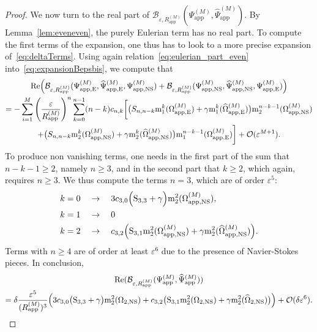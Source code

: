 \documentclass[11pt,reqno,a4paper]{amsart}
\def\eps{\varepsilon}
\def\Re{{\rm Re}}
\newcommand{\cB}{\mathcal{B}}
\newcommand{\cO}{\mathcal{O}}
\newcommand{\mrm}{\mathrm{m}}
\newcommand{\1}{\mathbbm{1}}
\theoremstyle{definition}
\theoremstyle{definition}
\numberwithin{equation}{section}
\newcommand{\Mapp}[2]{#1^{(#2)}_\mathrm{app}}
\newcommand{\Mappp}[3]{#1^{(#2)}_\mathrm{app,#3}}
\begin{document}
\begin{proof}
    We now turn to the real part of $\cB_{\eps,\Mapp{R}{M}}(\Mapp{\Psi}{M},\Mapp{\widehat{\Psi}}{M})$. By Lemma~\ref{lem:eveneven}, the purely Eulerian term has no real part. To compute the first terms of the expansion, one thus has to look to a more precise expansion of~\cref{eq:deltaTerms}. Using again relation~\cref{eq:eulerian_part_even} into~\cref{eq:expansionBepsbis}, we compute that
    \begin{multline}
        \Re\Big(\cB_{\eps,\Mapp{R}{M}}( \Mappp{\Psi}{M}{E},\Mappp{\widehat{\Psi}}{M}{E} ,\Mappp{\Psi}{M}{NS}) + \cB_{\eps,\Mapp{R}{M}}( \Mappp{\Psi}{M}{NS},\Mappp{\widehat{\Psi}}{M}{NS} ,\Mappp{\Psi}{M}{E}) \Big) \\ = - \sum_{i=1}^M \left(\frac{\eps}{\Mapp{R}{M}}\right)^n \sum_{k=0}^{n-1} (n-k)c_{n,k}
         \bigg[\big(S_{n,n-k} \mrm_1^k(\Mappp{\Omega}{M}{E}) + \gamma \mrm_1^k(\Mappp{\widehat{\Omega}}{M}{E})\big) \mrm_2^{n-k-1}(\Mappp{\Omega}{M}{NS})  \\ 
        + \big(S_{n,n-k} \mrm_2^k(\Mappp{\Omega}{M}{NS}) + \gamma \mrm_2^k(\Mappp{\widehat{\Omega}}{M}{NS})\big) \mrm_1^{n-k-1}(\Mappp{\Omega}{M}{E})\bigg] + \cO(\eps^{M+1}).
    \end{multline}
    To produce non vanishing terms, one needs in the first part of the sum that $n-k-1 \ge 2$, namely $n \ge 3$, and in the second part that $k \ge 2$, which again, requires $n \ge 3$. We thus compute the terms $n=3$, which are of order $\eps^5$:
        \begin{align}
        & k = 0 \quad \rightarrow \quad 3c_{3,0} \Big( {\rm S}_{3,3}  + \gamma\Big) \mrm_2^{2}(\Mappp{\Omega}{M}{NS}), \\
        & k = 1 \quad \rightarrow \quad 0 \\
        & k = 2 \quad \rightarrow \quad c_{3,2} \Big( {\rm S}_{3,1} \mrm_2^2( \Mappp{\Omega}{M}{NS}) + \gamma \mrm_2^2( \Mappp{\widehat{\Omega}}{M}{NS})\Big).
    \end{align}
    Terms with $n \ge 4$ are of order at least $\eps^6$ due to the presence of Navier-Stokes pieces. In conclusion,
    \begin{multline}
        \Re(\cB_{\eps,\Mapp{R}{M}}(\Mapp{\Psi}{M},\Mapp{\widehat{\Psi}}{M})) \\ = \delta\frac{\eps^5}{(\Mapp{R}{M})^3} \Big( 3c_{3,0} \big( {\rm S}_{3,3}  + \gamma\big) \mrm_2^{2}(\Omega_{2,\mathrm{NS}}) + c_{3,2} \big( {\rm S}_{3,1} \mrm_2^2( \Omega_{2,\mathrm{NS}}) + \gamma \mrm_2^2( \widehat{\Omega}_{2,\mathrm{NS}})\big) \Big) + \cO(\delta \eps^6).
    \end{multline}
    \end{proof}
\end{document}
